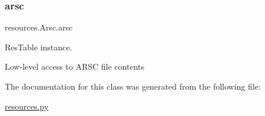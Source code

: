 \subsubsection{\texorpdfstring{arsc}{arsc}}
{\footnotesize\ttfamily resources.\+Arsc.\+arsc}



Res\+Table instance. 

Low-\/level access to A\+R\+SC file contents 

The documentation for this class was generated from the following file\+:\begin{DoxyCompactItemize}
\item 
\mbox{\hyperlink{resources_8py}{resources.\+py}}\end{DoxyCompactItemize}
